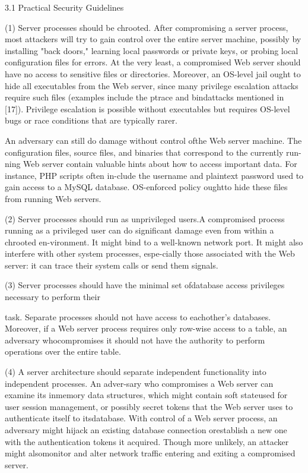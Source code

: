 3.1 Practical Security Guidelines

(1) Server processes should be chrooted. 
After compromising a server process, most attackers will try to gain control
over the entire server machine, possibly by installing "back doors," learning
local passwords or private keys, or probing local configuration files for
errors. 
At the very least, a compromised Web server should have no access to sensitive
files or directories.
Moreover, an OS-level jail ought to hide all executables from the Web server,
since many privilege escalation attacks require such files (examples include the
ptrace and bindattacks mentioned in [17]).
Privilege escalation is possible without executables but requires OS-level bugs
or race conditions that are typically rarer.

An adversary can still do damage without control ofthe Web server machine. The configuration files, source
files, and binaries that correspond to the currently run-ning Web server contain valuable hints about how to access important data. For instance, PHP scripts often in-clude the username and plaintext password used to gain
access to a MySQL database. OS-enforced policy oughtto hide these files from running Web servers.

(2) Server processes should run as unprivileged users.A compromised process running as a privileged user can
do significant damage even from within a chrooted en-vironment. It might bind to a well-known network port.
It might also interfere with other system processes, espe-cially those associated with the Web server: it can trace
their system calls or send them signals.

(3) Server processes should have the minimal set ofdatabase access privileges necessary to perform their

task. Separate processes should not have access to eachother's databases. Moreover, if a Web server process requires only row-wise access to a table, an adversary whocompromises it should not have the authority to perform
operations over the entire table.

(4) A server architecture should separate independent functionality into independent processes. An adver-sary who compromises a Web server can examine its inmemory data structures, which might contain soft stateused for user session management, or possibly secret tokens that the Web server uses to authenticate itself to itsdatabase. With control of a Web server process, an adversary might hijack an existing database connection orestablish a new one with the authentication tokens it acquired. Though more unlikely, an attacker might alsomonitor and alter network traffic entering and exiting a
compromised server.


